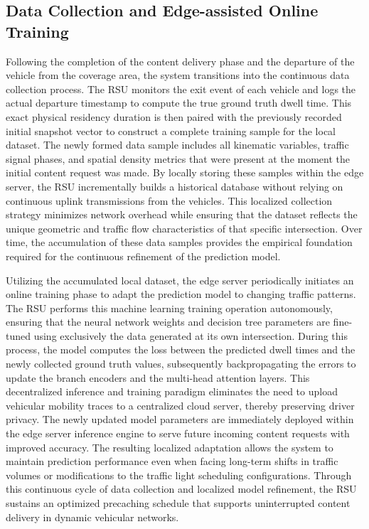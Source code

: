 \documentclass[journal]{IEEEtran}
\begin{document}
\subsection{Data Collection and Edge-assisted Online Training}

Following the completion of the content delivery phase and the departure of the vehicle from the coverage area, the system transitions into the continuous data collection process. The RSU monitors the exit event of each vehicle and logs the actual departure timestamp to compute the true ground truth dwell time. This exact physical residency duration is then paired with the previously recorded initial snapshot vector to construct a complete training sample for the local dataset. The newly formed data sample includes all kinematic variables, traffic signal phases, and spatial density metrics that were present at the moment the initial content request was made. By locally storing these samples within the edge server, the RSU incrementally builds a historical database without relying on continuous uplink transmissions from the vehicles. This localized collection strategy minimizes network overhead while ensuring that the dataset reflects the unique geometric and traffic flow characteristics of that specific intersection. Over time, the accumulation of these data samples provides the empirical foundation required for the continuous refinement of the prediction model.

Utilizing the accumulated local dataset, the edge server periodically initiates an online training phase to adapt the prediction model to changing traffic patterns. The RSU performs this machine learning training operation autonomously, ensuring that the neural network weights and decision tree parameters are fine-tuned using exclusively the data generated at its own intersection. During this process, the model computes the loss between the predicted dwell times and the newly collected ground truth values, subsequently backpropagating the errors to update the branch encoders and the multi-head attention layers. This decentralized inference and training paradigm eliminates the need to upload vehicular mobility traces to a centralized cloud server, thereby preserving driver privacy. The newly updated model parameters are immediately deployed within the edge server inference engine to serve future incoming content requests with improved accuracy. The resulting localized adaptation allows the system to maintain prediction performance even when facing long-term shifts in traffic volumes or modifications to the traffic light scheduling configurations. Through this continuous cycle of data collection and localized model refinement, the RSU sustains an optimized precaching schedule that supports uninterrupted content delivery in dynamic vehicular networks.
\end{document}
